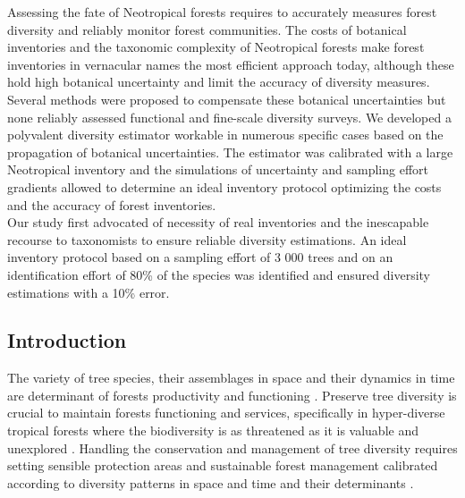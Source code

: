 \documentclass[
  11pt,
  french,
  A4paper,
  extrafontsizes,onecolumn,openright
  ]{memoir}
\begin{document}
Assessing the fate of Neotropical forests requires to accurately
measures forest diversity and reliably monitor forest communities. The
costs of botanical inventories and the taxonomic complexity of
Neotropical forests make forest inventories in vernacular names the most
efficient approach today, although these hold high botanical uncertainty
and limit the accuracy of diversity measures. Several methods were
proposed to compensate these botanical uncertainties but none reliably
assessed functional and fine-scale diversity surveys. We developed a
polyvalent diversity estimator workable in numerous specific cases based
on the propagation of botanical uncertainties. The estimator was
calibrated with a large Neotropical inventory and the simulations of
uncertainty and sampling effort gradients allowed to determine an ideal
inventory protocol optimizing the costs and the accuracy of forest
inventories.\\
Our study first advocated of necessity of real inventories and the
inescapable recourse to taxonomists to ensure reliable diversity
estimations. An ideal inventory protocol based on a sampling effort of 3
000 trees and on an identification effort of 80\% of the species was
identified and ensured diversity estimations with a 10\% error.

\subsection{Introduction}\label{introduction}

The variety of tree species, their assemblages in space and their
dynamics in time are determinant of forests productivity and functioning
\autocite{Cardinale2012}. Preserve tree diversity is crucial to maintain
forests functioning and services, specifically in hyper-diverse tropical
forests where the biodiversity is as threatened as it is valuable and
unexplored \autocite{Barlow2018}. Handling the conservation and
management of tree diversity requires setting sensible protection areas
and sustainable forest management calibrated according to diversity
patterns in space and time and their determinants
\autocites{Gibson2011}{Sist2015}.
\end{document}
